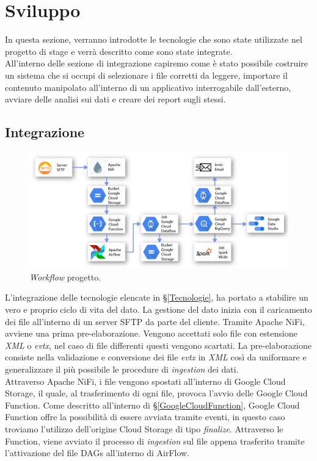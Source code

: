 \chapter{Sviluppo}\label{ch:sviluppo}
In questa sezione, verranno introdotte le tecnologie che sono state utilizzate nel progetto di stage e verrà descritto come sono state integrate. 
\\
All'interno delle sezione di integrazione capiremo come è stato possibile costruire un sistema che si occupi di selezionare i file corretti da leggere, importare il contenuto manipolato all'interno di un applicativo interrogabile dall'esterno, avviare delle analisi sui dati e creare dei report sugli stessi.
\section{Integrazione}
\begin{figure}[h!]
	\centering
	\includegraphics[scale=0.58]{figures/Schema_complessivo_ridotto}
	\caption[Workflow progetto.]{\emph{Workflow} progetto.
		\label{fig:workflow}}
\end{figure}	
L'integrazione delle tecnologie elencate in §\ref{Tecnologie}{}, ha portato a stabilire un vero e proprio ciclo di vita del dato.
La gestione del dato inizia con il caricamento dei file all'interno di un server SFTP da parte del cliente. Tramite Apache NiFi, avviene una prima pre-elaborazione. Vengono accettati solo file con estensione \emph{XML} o \emph{evtx}, nel caso di file differenti questi vengono scartati. La pre-elaborazione consiste nella validazione e conversione dei file \emph{evtx} in \emph{XML} così da uniformare e generalizzare il più possibile le procedure di \emph{ingestion} dei dati.
\\
Attraverso Apache NiFi, i file vengono spostati all'interno di Google Cloud Storage, il quale, al trasferimento di ogni file, provoca l'avvio delle Google Cloud Function. Come descritto all'interno di §\ref{GoogleCloudFunction}{}, Google Cloud Function offre la possibilità di essere avviata tramite eventi, in questo caso troviamo l'utilizzo dell'origine Cloud Storage di tipo \emph{finalize}. Attraverso le Function, viene avviato il processo di \emph{ingestion} sul file appena trasferito tramite l'attivazione del file DAGs all'interno di AirFlow.

